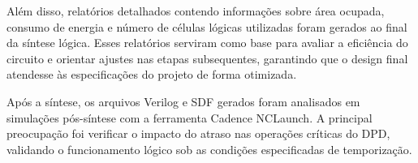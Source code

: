 Além disso, relatórios detalhados contendo informações sobre área ocupada, consumo de energia e número de células lógicas utilizadas foram gerados ao final da síntese lógica. Esses relatórios serviram como base para avaliar a eficiência do circuito e orientar ajustes nas etapas subsequentes, garantindo que o design final atendesse às especificações do projeto de forma otimizada.

Após a síntese, os arquivos Verilog e SDF gerados foram analisados em simulações pós-síntese com a ferramenta Cadence NCLaunch. A principal preocupação foi verificar o impacto do atraso nas operações críticas do DPD, validando o funcionamento lógico sob as condições especificadas de temporização.